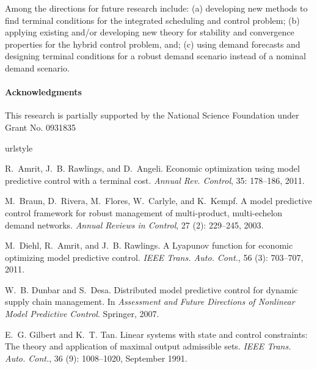 \documentclass{elsarticle}
\theoremstyle{definition}
\begin{document}
Among the directions for future research include: (a) developing new methods to
find terminal conditions for the integrated scheduling and control
problem; (b) applying existing and/or developing  new theory
for stability and convergence properties for the hybrid control problem,
and; (c) using demand forecasts and designing terminal
conditions for a robust demand scenario instead of a nominal demand
scenario. 

\paragraph{Acknowledgments}
This research is partially supported by the National Science Foundation
under Grant No. 0931835


\begin{thebibliography}{28}
\providecommand{\natexlab}[1]{#1}
\providecommand{\url}[1]{\texttt{#1}}
\expandafter\ifx\csname urlstyle\endcsname\relax
  \providecommand{\doi}[1]{doi: #1}\else
  \providecommand{\doi}{doi: \begingroup \urlstyle{rm}\Url}\fi

R.~Amrit, J.~B. Rawlings, and D.~Angeli.
\newblock Economic optimization using model predictive control with a terminal
  cost.
\newblock \emph{Annual Rev. Control}, 35: 178--186, 2011.

M.~Braun, D.~Rivera, M.~Flores, W.~Carlyle, and K.~Kempf.
\newblock A model predictive control framework for robust management of
  multi-product, multi-echelon demand networks.
\newblock \emph{Annual Reviews in Control}, 27 (2): 229--245,
  2003.

M.~Diehl, R.~Amrit, and J.~B. Rawlings.
\newblock A {Lyapunov} function for economic optimizing model predictive
  control.
\newblock \emph{{IEEE} Trans. Auto. Cont.}, 56 (3): 703--707,
  2011.

W.~B. Dunbar and S.~Desa.
\newblock Distributed model predictive control for dynamic supply chain
  management.
\newblock In \emph{Assessment and Future Directions of Nonlinear Model
  Predictive Control}. Springer, 2007.

E.~G. Gilbert and K.~T. Tan.
\newblock Linear systems with state and control constraints: {T}he theory and
  application of maximal output admissible sets.
\newblock \emph{{IEEE} Trans. Auto. Cont.}, 36 (9):
  1008--1020, September 1991.


\end{thebibliography}
\end{document}
